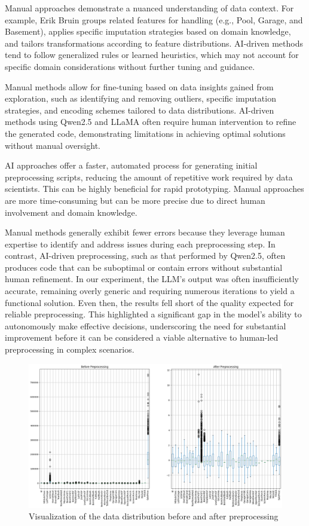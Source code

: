 Manual approaches demonstrate a nuanced understanding of data context. For
example, Erik Bruin groups related features for handling (e.g., Pool, Garage,
and Basement), applies specific imputation strategies based on domain
knowledge, and tailors transformations according to feature distributions.
AI-driven methods tend to follow generalized rules or learned heuristics, which
may not account for specific domain considerations without further tuning and
guidance.

Manual methods allow for fine-tuning based on data insights gained from
exploration, such as identifying and removing outliers, specific imputation
strategies, and encoding schemes tailored to data distributions. AI-driven
methods using Qwen2.5 and LLaMA often require human intervention to refine the generated
code, demonstrating limitations in achieving optimal solutions without manual
oversight.

AI approaches offer a faster, automated process for generating initial
preprocessing scripts, reducing the amount of repetitive work required by data
scientists. This can be highly beneficial for rapid prototyping. Manual
approaches are more time-consuming but can be more precise due to direct human
involvement and domain knowledge.

Manual methods generally exhibit fewer errors because they leverage human expertise to identify and address issues during each preprocessing step. In contrast, AI-driven preprocessing, such as that performed by Qwen2.5, often produces code that can be suboptimal or contain errors without substantial human refinement. In our experiment, the LLM's output was often insufficiently accurate, remaining overly generic and requiring numerous iterations to yield a functional solution. Even then, the results fell short of the quality expected for reliable preprocessing. This highlighted a significant gap in the model's ability to autonomously make effective decisions, underscoring the need for substantial improvement before it can be considered a viable alternative to human-led preprocessing in complex scenarios.

\begin{figure}[H]
    \centering
    \includegraphics[width=1\textwidth]{media/comparison_house_prices.png}
    \caption{Visualization of the data distribution before and after preprocessing}\label{fig:comparison-house-prices}
\end{figure}

